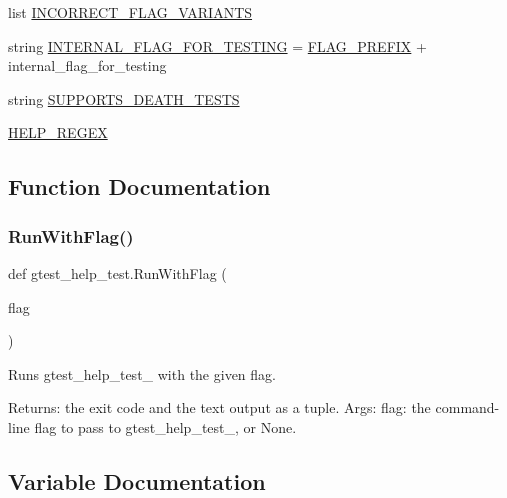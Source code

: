 \begin{DoxyCompactItemize}
\item 
list \hyperlink{namespacegtest__help__test_a6f677b9f975f09db7604a5ee9c4821a3}{I\+N\+C\+O\+R\+R\+E\+C\+T\+\_\+\+F\+L\+A\+G\+\_\+\+V\+A\+R\+I\+A\+N\+TS}
\item 
string \hyperlink{namespacegtest__help__test_aa7f487cde98f691eecc5f1f5e67c0a69}{I\+N\+T\+E\+R\+N\+A\+L\+\_\+\+F\+L\+A\+G\+\_\+\+F\+O\+R\+\_\+\+T\+E\+S\+T\+I\+NG} = \hyperlink{namespacegtest__help__test_a9e357a76dd993057c826ec411c9a4b3c}{F\+L\+A\+G\+\_\+\+P\+R\+E\+F\+IX} + \textquotesingle{}internal\+\_\+flag\+\_\+for\+\_\+testing\textquotesingle{}
\item 
string \hyperlink{namespacegtest__help__test_a70c7e8b24ce75dfa26ff540b861cdc54}{S\+U\+P\+P\+O\+R\+T\+S\+\_\+\+D\+E\+A\+T\+H\+\_\+\+T\+E\+S\+TS}
\item 
\hyperlink{namespacegtest__help__test_acaee97106f5b6ad6de66778688d4b906}{H\+E\+L\+P\+\_\+\+R\+E\+G\+EX}
\end{DoxyCompactItemize}


\subsection{Function Documentation}
\mbox{\label{namespacegtest__help__test_a3d369750dac11a6dca523139fe1e6c86}} 
\subsubsection{\texorpdfstring{Run\+With\+Flag()}{RunWithFlag()}}
{\footnotesize\ttfamily def gtest\+\_\+help\+\_\+test.\+Run\+With\+Flag (\begin{DoxyParamCaption}\item[{}]{flag }\end{DoxyParamCaption})}

\begin{DoxyVerb}Runs gtest_help_test_ with the given flag.

Returns:
  the exit code and the text output as a tuple.
Args:
  flag: the command-line flag to pass to gtest_help_test_, or None.
\end{DoxyVerb}
 

\subsection{Variable Documentation}
\mbox{\label{namespacegtest__help__test_a322bbb8bf27d7701c76fb5704a1fda1f}} 
